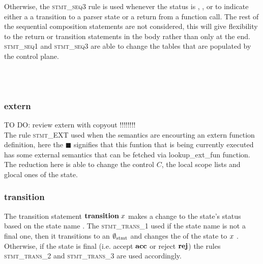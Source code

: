 \documentclass[UTF8]{article}
\begin{document}
Otherwise, the \textsc{stmt\_seq3}  rule is used whenever the status is \returnst{}, \accept{} , \reject{} or \trans{} to indicate either a a transition to a parser state or a return from a function call. The rest of the sequential composition statements are not considered, this will give flexibility to the return or transition statements in the body rather than only at the end.
\textsc{stmt\_seq1} and \textsc{stmt\_seq3} are able to change the tables that are populated by the control plane.

\begin{figure}[h!]
    \ottusedrule{\ottdrulestmtXXseqOne{}} \\
    \ottusedrule{\ottdrulestmtXXseqTwo{}} \\
    \ottusedrule{\ottdrulestmtXXseqThree{}}
\end{figure}


\subsubsection*{extern}
TO DO: review extern with copyout !!!!!!!! \\
The rule \textsc{stmt\_EXT} used when the semantics are encourting an extern function definition, here the $\blacksquare$ signifies that this funtion that is being currently executed has some external semantics that can be fetched via lookup\_ext\_fun function. The reduction here is able to change the control $C$, the local scope lists and glocal ones of the state.


\begin{figure}[ht!]
    \ottusedrule{\ottdrulestmtXXext{}}
\end{figure}



\subsubsection*{transition}
The transition statement $\mathbf{transition} \; x $ makes a change to the state's status \status{} based on the state name \vn{}. The \textsc{stmt\_trans\_1} used if the state name is not a final one, then it transitions to an $\emptyset_{ \mathrm{stmt} }{}$ and changes the \status{} of the state to \trans{} $x$ . Otherwise, if the state is final (i.e. accept $\textbf{acc}$ or reject $\reject$) the rules \textsc{stmt\_trans\_2} and \textsc{stmt\_trans\_3} are used accordingly.

\begin{figure}[ht!]
    \ottusedrule{\ottdrulestmtXXtransXXOne{}} \\
    \ottusedrule{\ottdrulestmtXXtransXXTwo{}} \\
    \ottusedrule{\ottdrulestmtXXtransXXThree{}} 
\end{figure}
\end{document}
